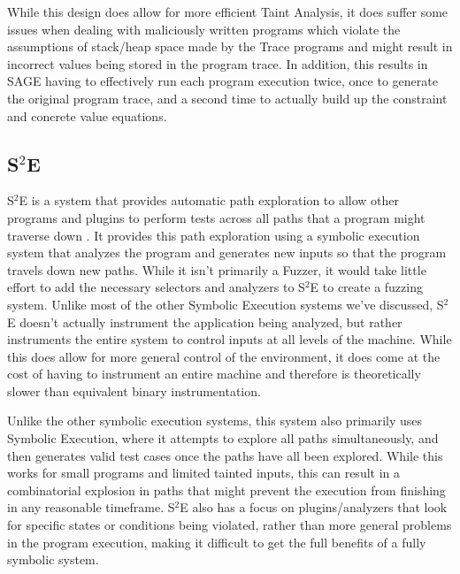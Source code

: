 While this design does allow for more efficient Taint Analysis, it does suffer
some issues when dealing with maliciously written programs which violate the
assumptions of stack/heap space made by the Trace programs and might result in
incorrect values being stored in the program trace. In addition, this results in
SAGE having to effectively run each program execution twice, once to generate
the original program trace, and a second time to actually build up the
constraint and concrete value equations.

\subsection{S$^2$E}
S$^2$E is a system that provides automatic path exploration to allow other
programs and plugins to perform tests across all paths that a program might
traverse down \cite{s2e}. It provides this path exploration using a symbolic
execution system that analyzes the program and generates new inputs so that the
program travels down new paths. While it isn't primarily a Fuzzer, it would take
little effort to add the necessary selectors and analyzers to S$^2$E to create a
fuzzing system. Unlike most of the other Symbolic Execution systems we've
discussed, S$^2$E doesn't actually instrument the application being analyzed,
but rather instruments the entire system to control inputs at all levels of the
machine. While this does allow for more general control of the environment, it
does come at the cost of having to instrument an entire machine and therefore is
theoretically slower than equivalent binary instrumentation. 

Unlike the other symbolic execution systems, this system also primarily uses
Symbolic Execution, where it attempts to explore all paths simultaneously, and
then generates valid test cases once the paths have all been explored. While
this works for small programs and limited tainted inputs, this can result in a
combinatorial explosion in paths that might prevent the execution from finishing
in any reasonable timeframe. S$^2$E also has a focus on plugins/analyzers that
look for specific states or conditions being violated, rather than more general
problems in the program execution, making it difficult to get the full benefits
of a fully symbolic system.
